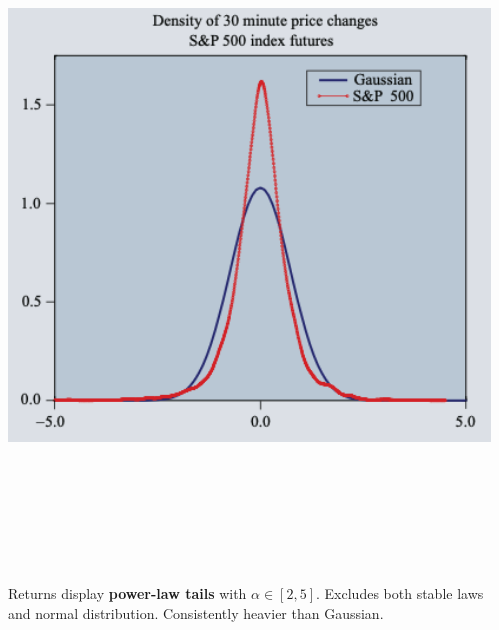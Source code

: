 \documentclass[final]{beamer}
\begin{document}
\begin{frame}[t]
\begin{columns}[t]
\begin{column}{.48\linewidth}
\vspace{0.5cm}

\begin{tcolorbox}[mybox, title=Heavy Tails Distribution]
\begin{center}
\includegraphics[width=0.98\linewidth,height=18cm,keepaspectratio]{figure2_density.png}
\end{center}
\vspace{0.3cm}
\large
Returns display \textbf{power-law tails} with $\alpha \in [2,5]$. Excludes both stable laws and normal distribution. Consistently heavier than Gaussian.
\end{tcolorbox}

\vspace{0.5cm}



\end{column}

\begin{column}{.48\linewidth}



\end{column}
\end{columns}
\end{frame}
\end{document}
